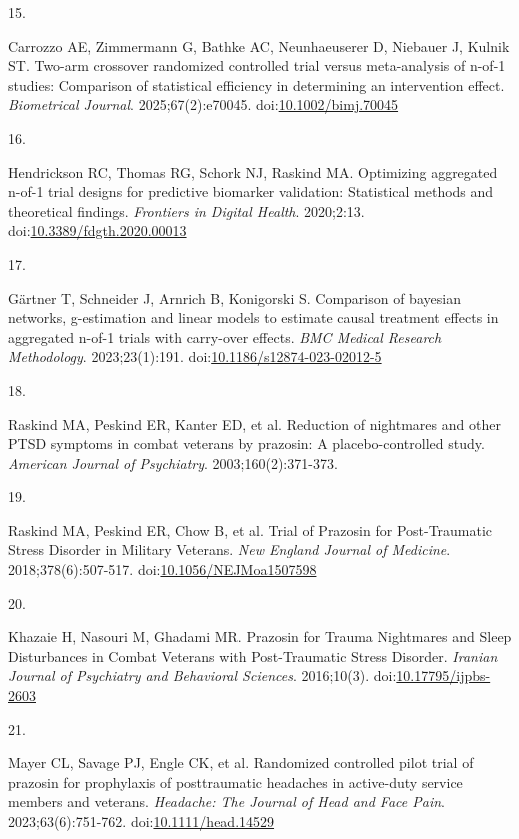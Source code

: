\documentclass[
  11pt,
]{article}
\newlength{\cslhangindent}
\newlength{\csllabelwidth}
\newenvironment{CSLReferences}[2] %
 {\begin{list}{}{%
  \setlength{\itemindent}{0pt}
  \setlength{\leftmargin}{0pt}
  \setlength{\parsep}{0pt}
  \ifodd #1
   \setlength{\leftmargin}{\cslhangindent}
   \setlength{\itemindent}{-1\cslhangindent}
  \fi
  \setlength{\itemsep}{#2\baselineskip}}}
 {\end{list}}
\newcommand{\CSLLeftMargin}[1]{\parbox[t]{\csllabelwidth}{\strut#1\strut}}
\newcommand{\CSLRightInline}[1]{\parbox[t]{\linewidth - \csllabelwidth}{\strut#1\strut}}
\begin{document}
\begin{CSLReferences}{0}{1}
\CSLLeftMargin{15. }%
\CSLRightInline{Carrozzo AE, Zimmermann G, Bathke AC, Neunhaeuserer D,
Niebauer J, Kulnik ST. Two-arm crossover randomized controlled trial
versus meta-analysis of n-of-1 studies: Comparison of statistical
efficiency in determining an intervention effect. \emph{Biometrical
Journal}. 2025;67(2):e70045.
doi:\href{https://doi.org/10.1002/bimj.70045}{10.1002/bimj.70045}}

\CSLLeftMargin{16. }%
\CSLRightInline{Hendrickson RC, Thomas RG, Schork NJ, Raskind MA.
Optimizing aggregated n-of-1 trial designs for predictive biomarker
validation: Statistical methods and theoretical findings.
\emph{Frontiers in Digital Health}. 2020;2:13.
doi:\href{https://doi.org/10.3389/fdgth.2020.00013}{10.3389/fdgth.2020.00013}}

\CSLLeftMargin{17. }%
\CSLRightInline{Gärtner T, Schneider J, Arnrich B, Konigorski S.
Comparison of bayesian networks, g-estimation and linear models to
estimate causal treatment effects in aggregated n-of-1 trials with
carry-over effects. \emph{BMC Medical Research Methodology}.
2023;23(1):191.
doi:\href{https://doi.org/10.1186/s12874-023-02012-5}{10.1186/s12874-023-02012-5}}

\CSLLeftMargin{18. }%
\CSLRightInline{{Raskind MA, Peskind ER, Kanter ED, et al.} Reduction of
nightmares and other {PTSD} symptoms in combat veterans by prazosin: A
placebo-controlled study. \emph{American Journal of Psychiatry}.
2003;160(2):371-373.}

\CSLLeftMargin{19. }%
\CSLRightInline{Raskind MA, Peskind ER, Chow B, et al. Trial of
{Prazosin} for {Post-Traumatic Stress Disorder} in {Military Veterans}.
\emph{New England Journal of Medicine}. 2018;378(6):507-517.
doi:\href{https://doi.org/10.1056/NEJMoa1507598}{10.1056/NEJMoa1507598}}

\CSLLeftMargin{20. }%
\CSLRightInline{Khazaie H, Nasouri M, Ghadami MR. Prazosin for {Trauma
Nightmares} and {Sleep Disturbances} in {Combat Veterans} with
{Post-Traumatic Stress Disorder}. \emph{Iranian Journal of Psychiatry
and Behavioral Sciences}. 2016;10(3).
doi:\href{https://doi.org/10.17795/ijpbs-2603}{10.17795/ijpbs-2603}}

\CSLLeftMargin{21. }%
\CSLRightInline{Mayer CL, Savage PJ, Engle CK, et al. Randomized
controlled pilot trial of prazosin for prophylaxis of posttraumatic
headaches in active-duty service members and veterans. \emph{Headache:
The Journal of Head and Face Pain}. 2023;63(6):751-762.
doi:\href{https://doi.org/10.1111/head.14529}{10.1111/head.14529}}


\end{CSLReferences}
\end{document}
